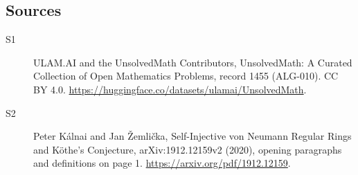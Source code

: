 \documentclass[11pt]{article}
\begin{document}
\subsection{Sources}
\begin{description}
\item[\hypertarget{source:1455:1}{S1}] ULAM.AI and the UnsolvedMath Contributors, UnsolvedMath: A Curated Collection of Open Mathematics Problems, record 1455 (ALG-010). CC BY 4.0. \url{https://huggingface.co/datasets/ulamai/UnsolvedMath}.
\item[\hypertarget{source:1455:2}{S2}] Peter Kálnai and Jan Žemlička, Self-Injective von Neumann Regular Rings and Köthe’s Conjecture, arXiv:1912.12159v2 (2020), opening paragraphs and definitions on page 1. \url{https://arxiv.org/pdf/1912.12159}.
\end{description}
\label{end:1455}
\end{document}
